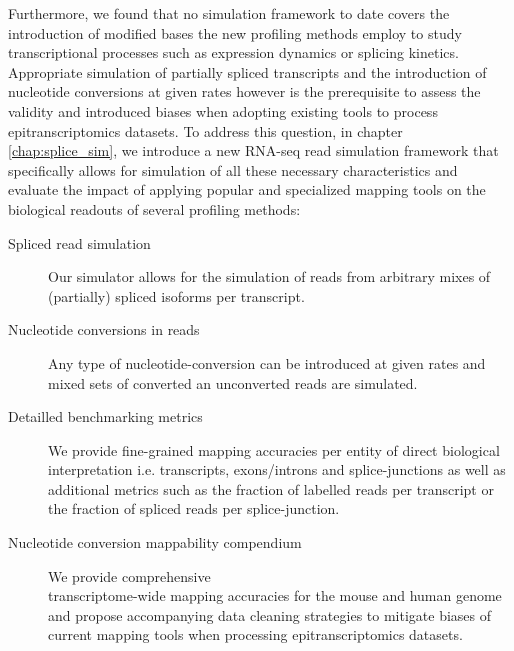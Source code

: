 Furthermore, we found that no simulation framework to date covers the introduction of modified bases the new profiling methods employ to study transcriptional processes such as expression dynamics or splicing kinetics. Appropriate simulation of partially spliced transcripts and the introduction of nucleotide conversions at given rates however is the prerequisite to assess the validity and introduced biases when adopting existing tools to process epitranscriptomics datasets. To address this question, in chapter \ref{chap:splice_sim}, we introduce a new RNA-seq read simulation framework that specifically allows for simulation of all these necessary characteristics and evaluate the impact of applying popular and specialized mapping tools on the biological readouts of several profiling methods:

\begin{description}
    \item[Spliced read simulation] Our simulator allows for the simulation of reads from arbitrary mixes of (partially) spliced isoforms per transcript.
    \item[Nucleotide conversions in reads] Any type of nucleotide-conversion can be introduced at given rates and mixed sets of converted an unconverted reads are simulated.
    \item[Detailled benchmarking metrics] We provide fine-grained mapping accuracies per entity of direct biological interpretation i.e. transcripts, exons/introns and splice-junctions as well as additional metrics such as the fraction of labelled reads per transcript or the fraction of spliced reads per splice-junction.
    \item[Nucleotide conversion mappability compendium] We provide comprehensive \\ transcriptome-wide mapping accuracies for the mouse and human genome and propose accompanying data cleaning strategies to mitigate biases of current mapping tools when processing epitranscriptomics datasets.
\end{description}